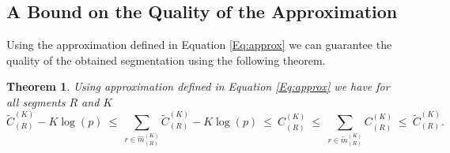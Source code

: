 \documentclass[11pt]{llncs}
\newtheorem{theo}{Theorem}[section]    %
\begin{document}
\subsection{A Bound on the Quality of the Approximation }
Using the approximation defined in Equation \ref{Eq:approx} we can guarantee the quality of the obtained segmentation using the following theorem.
\begin{theo}
Using approximation defined in Equation \ref{Eq:approx} we have for all segments $R$ and $K$
$$\widetilde{C}_{(R)}^{(K)} - K \log(p) 
\ \leq \ 
\underset{r \in \widehat{m}_{(R)}^{(K)}}{\operatorname{\sum}} \widetilde{C}_{(R)}^{(K)} - K \log(p) 
\ \leq \ 
{C}_{(R)}^{(K)} 
\ \leq \ 
\underset{r \in \widetilde{m}_{(R)}^{(K)}}{\operatorname{\sum}} {C}_{(R)}^{(K)} 
\ \leq \ 
\widetilde{C}_{(R)}^{(K)}.$$
\label{theo:theoapprox}
\end{theo}
\vspace{-1cm}
\end{document}
